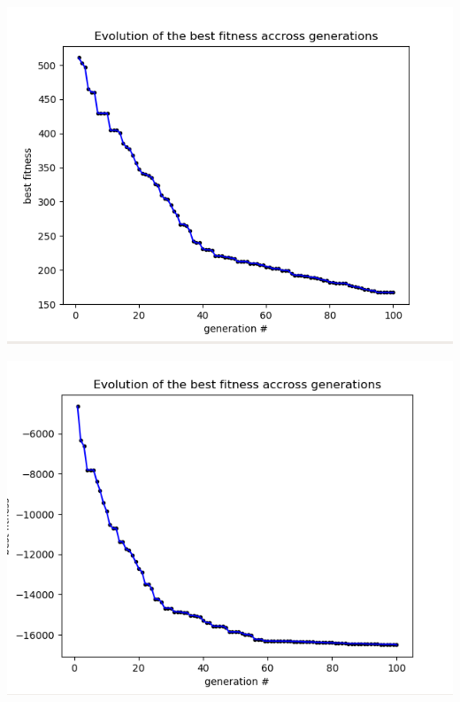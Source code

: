 \documentclass[12pt]{article}
\begin{document}
				\begin{minipage}{0.6\linewidth}
					\includegraphics[width=\linewidth]{9.png}
				\end{minipage}
				\hfill
				\begin{minipage}{0.6\linewidth}
					\includegraphics[width=\linewidth]{10.png}
				\end{minipage}
\end{document}
